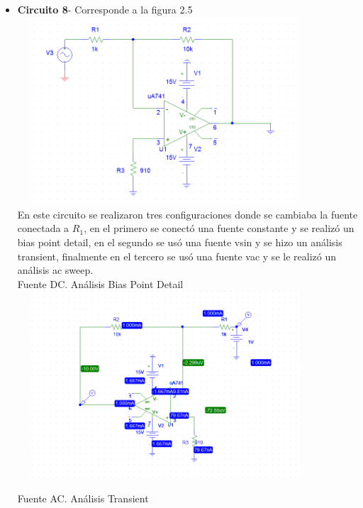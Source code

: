 \documentclass[12pt]{article}
\begin{document}
\begin{itemize}
		\newpage
		
		\item \textbf{Circuito 8}- Corresponde a la figura 2.5\\
		
		\includegraphics[width=11cm,height=7cm]{Img/opam_ua741}\\

		\noindent En este circuito se realizaron tres configuraciones donde se cambiaba la fuente conectada a $R_1$, en el primero se conectó una fuente constante y se realizó un bias point detail, en el segundo se usó una fuente vsin y se hizo un análisis transient, finalmente en el tercero se usó una fuente vac y se le realizó un análisis ac sweep.\\
		
		\noindent Fuente DC. Análisis Bias Point Detail\\
		
		\includegraphics[width=11cm,height=7cm]{Img/opam_ua741_bias_analisis_DC}\\
		
		\newpage
		
		\noindent Fuente AC. Análisis Transient\\
		

\end{itemize}
\end{document}
